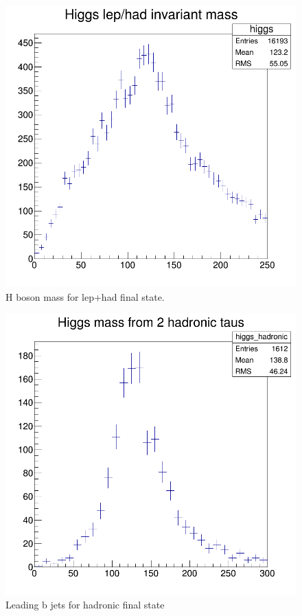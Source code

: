 \documentclass[12pt]{article}
\begin{document}
		 \begin{figure}[h]
		 	\centering
		 	\includegraphics[scale=.36]{lep_had.png}
		 	\caption{H boson mass for lep+had final state.}
		 \end{figure}
			 \begin{figure}[h]
			 	\centering
			 	\includegraphics[scale=.31]{hadronic.png}
			 	\caption{Leading b jets for hadronic final state}
			 \end{figure}
\end{document}
